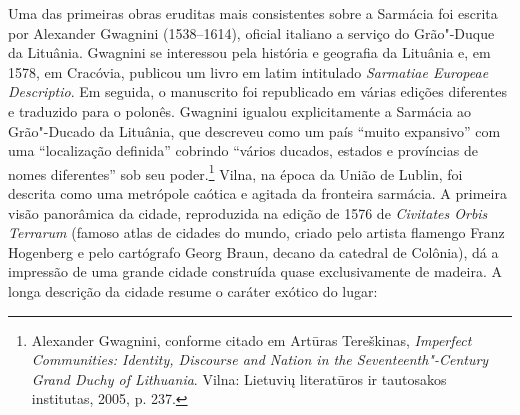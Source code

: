 %

Uma das primeiras obras eruditas mais consistentes sobre a Sarmácia foi
escrita por Alexander Gwagnini (1538--1614), oficial italiano a serviço
do Grão"-Duque da Lituânia. Gwagnini se interessou pela história e
geografia da Lituânia e, em 1578, em Cracóvia, publicou um livro em
latim intitulado \textit{Sarmatiae Europeae Descriptio}. Em seguida, o
manuscrito foi republicado em várias edições diferentes e traduzido para
o polonês. Gwagnini igualou explicitamente a Sarmácia ao Grão"-Ducado da
Lituânia, que descreveu como um país ``muito expansivo'' com uma
``localização definida'' cobrindo ``vários ducados, estados e províncias
de nomes diferentes'' sob seu poder.\footnote{Alexander Gwagnini, conforme citado em Artūras Tereškinas, \textit{Imperfect Communities: Identity, Discourse and Nation in the Seventeenth"-Century Grand Duchy of Lithuania}. Vilna: Lietuvių literatūros ir tautosakos institutas, 2005, p. 237.}
Vilna, na época da União de Lublin, foi descrita como uma metrópole
caótica e agitada da fronteira sarmácia. A primeira visão panorâmica da
cidade, reproduzida na edição de 1576 de \textit{Civitates Orbis Terrarum}
(famoso atlas de cidades do mundo, criado pelo artista flamengo Franz
Hogenberg e pelo cartógrafo Georg Braun, decano da catedral de Colônia),
dá a impressão de uma grande cidade construída quase exclusivamente de
madeira. A longa descrição da cidade resume o caráter exótico do lugar:

